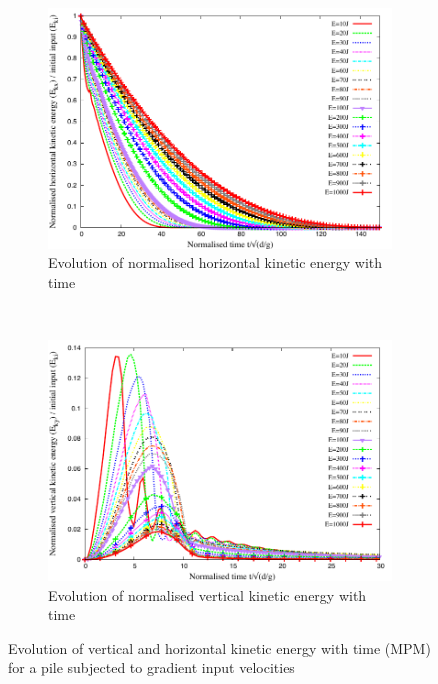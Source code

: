 \begin{figure}[tbhp]
\centering
\begin{subfigure}[b]{0.975\textwidth}
\includegraphics[width=\textwidth]{Normalised_KEx_Slope}
\caption{Evolution of normalised horizontal kinetic energy with time}
\label{fig:Normalised_KEx_Slope}
\end{subfigure}
\\
\begin{subfigure}[b]{0.975\textwidth}
\centering
\includegraphics[width=\textwidth]{Normalised_KEy_Slope}
\caption{Evolution of normalised vertical kinetic energy with time}
\label{fig:Normalised_KEy_Slope}
\end{subfigure}
\caption{Evolution of vertical and horizontal kinetic energy with time (MPM) 
for a pile subjected to gradient input velocities}
\label{fig:Normalised_KEx_KEy_Slope}
\end{figure}

